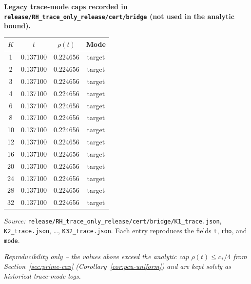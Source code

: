 \begin{center}
  \textbf{Legacy trace-mode caps recorded in \texttt{release/RH\_trace\_only\_release/cert/bridge} (not used in the analytic bound).}
\end{center}
\begin{center}
  \begin{tabular}{cccc}
    \toprule
    $K$ & $t$ & $\rho(t)$ & Mode \\
    \midrule
    1  & 0.137100 & 0.224656 & target \\
    2  & 0.137100 & 0.224656 & target \\
    3  & 0.137100 & 0.224656 & target \\
    4  & 0.137100 & 0.224656 & target \\
    6  & 0.137100 & 0.224656 & target \\
    8  & 0.137100 & 0.224656 & target \\
    10 & 0.137100 & 0.224656 & target \\
    12 & 0.137100 & 0.224656 & target \\
    16 & 0.137100 & 0.224656 & target \\
    20 & 0.137100 & 0.224656 & target \\
    24 & 0.137100 & 0.224656 & target \\
    28 & 0.137100 & 0.224656 & target \\
    32 & 0.137100 & 0.224656 & target \\
    \bottomrule
  \end{tabular}
\end{center}
\par\smallskip
\noindent\emph{Source:} \texttt{release/RH\_trace\_only\_release/cert/bridge/K1\_trace.json}, \texttt{K2\_trace.json}, …, \texttt{K32\_trace.json}. Each entry reproduces the fields \texttt{t}, \texttt{rho}, and \texttt{mode}.
\begin{center}
  \footnotesize\itshape Reproducibility only – the values above exceed the analytic cap $\rho(t)\le c_*/4$ from Section~\ref{sec:prime-cap} (Corollary~\ref{cor:pcu-uniform}) and are kept solely as historical trace-mode logs.
\end{center}
